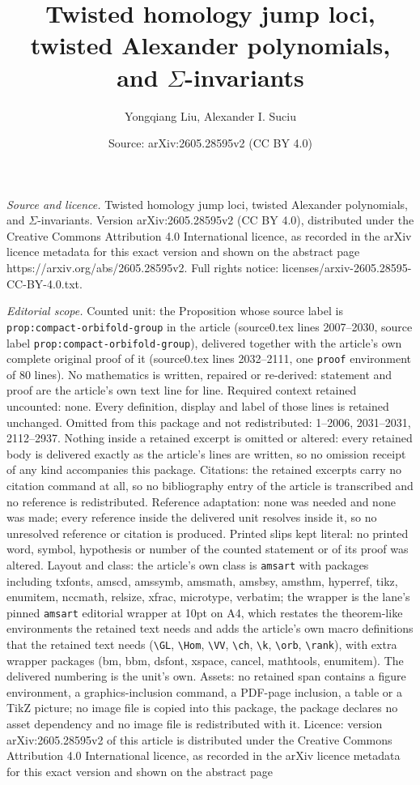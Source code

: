 \documentclass[10pt,a4paper]{amsart}
\title[Twisted homology jump loci, twisted Alexander polynomials, a]{Twisted homology jump loci, twisted Alexander polynomials, and $\Sigma$-invariants}
\author{Yongqiang Liu, Alexander I. Suciu}
\date{Source: arXiv:2605.28595v2 (CC BY 4.0)}
\begin{document}
\maketitle

\noindent\emph{Source and licence.} Twisted homology jump loci, twisted Alexander polynomials, and $\Sigma$-invariants. Version arXiv:2605.28595v2 (CC BY 4.0), distributed under the Creative Commons Attribution 4.0 International licence, as recorded in the arXiv licence metadata for this exact version and shown on the abstract page https://arxiv.org/abs/2605.28595v2. Full rights notice: licenses/arxiv-2605.28595-CC-BY-4.0.txt.\par\smallskip

\noindent\textit{Editorial scope.} Counted unit: the Proposition whose source label is \texttt{prop:compact-orbifold-group} in the article (source0.tex lines 2007--2030, source label \texttt{prop:compact-orbifold-group}), delivered together with the article's own complete original proof of it (source0.tex lines 2032--2111, one \texttt{proof} environment of 80 lines). No mathematics is written, repaired or re-derived: statement and proof are the article's own text line for line. Required context retained uncounted: none. Every definition, display and label of those lines is retained unchanged. Omitted from this package and not redistributed: 1--2006, 2031--2031, 2112--2937. Nothing inside a retained excerpt is omitted or altered: every retained body is delivered exactly as the article's lines are written, so no omission receipt of any kind accompanies this package. Citations: the retained excerpts carry no citation command at all, so no bibliography entry of the article is transcribed and no reference is redistributed. Reference adaptation: none was needed and none was made; every reference inside the delivered unit resolves inside it, so no unresolved reference or citation is produced. Printed slips kept literal: no printed word, symbol, hypothesis or number of the counted statement or of its proof was altered. Layout and class: the article's own class is \texttt{amsart} with packages including txfonts, amscd, amssymb, amsmath, amsbsy, amsthm, hyperref, tikz, enumitem, nccmath, relsize, xfrac, microtype, verbatim; the wrapper is the lane's pinned \texttt{amsart} editorial wrapper at 10pt on A4, which restates the theorem-like environments the retained text needs and adds the article's own macro definitions that the retained text needs (\texttt{\textbackslash GL}, \texttt{\textbackslash Hom}, \texttt{\textbackslash VV}, \texttt{\textbackslash ch}, \texttt{\textbackslash k}, \texttt{\textbackslash orb}, \texttt{\textbackslash rank}), with extra wrapper packages (bm, bbm, dsfont, xspace, cancel, mathtools, enumitem). The delivered numbering is the unit's own. Assets: no retained span contains a figure environment, a graphics-inclusion command, a PDF-page inclusion, a table or a TikZ picture; no image file is copied into this package, the package declares no asset dependency and no image file is redistributed with it. Licence: version arXiv:2605.28595v2 of this article is distributed under the Creative Commons Attribution 4.0 International licence, as recorded in the arXiv licence metadata for this exact version and shown on the abstract page 
\end{document}
